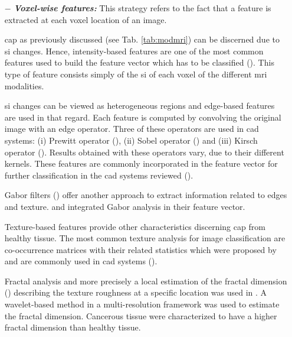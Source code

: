 \begin{enumerate}[leftmargin=*]

\item[$-$] \textbf{\textit{Voxel-wise features:}} This strategy refers to the fact that a feature is extracted at each voxel location of an image.

  \ac{cap} as previously discussed (see Tab. \ref{tab:modmri}) can be discerned due to \ac{si} changes. Hence, intensity-based features are one of the most common features used to build the feature vector which has to be classified (\cite{Ampeliotis2007,Ampeliotis2008,Artan2009,Artan2010,Chan2003,Langer2009,Litjens2011,Litjens2012,Litjens2014,Liu2009,Niaf2011,Niaf2012,Viswanath2008a,Viswanath2011}). This type of feature consists simply of the \ac{si} of each voxel of the different \ac{mri} modalities.

  \Ac{si} changes can be viewed as heterogeneous regions and edge-based features are used in that regard. Each feature is computed by convolving the original image with an edge operator. Three of these operators are used in \ac{cad} systems: (i) Prewitt operator (\cite{Prewitt1970}), (ii) Sobel operator (\cite{Sobel1970}) and (iii) Kirsch operator (\cite{Kirsch1971}). Results obtained with these operators vary, due to their different kernels. These features are commonly incorporated in the feature vector for further classification in the \ac{cad} systems reviewed (\cite{Niaf2011,Niaf2012,Tiwari2009a,Tiwari2010,Tiwari2013,Viswanath2008,Viswanath2011}).

  Gabor filters (\cite{Gabor1946,Daugman1985}) offer another approach to extract information related to edges and texture. \cite{Viswanath2008a,Viswanath2012} and \cite{Tiwari2012} integrated Gabor analysis in their feature vector.

  Texture-based features provide other characteristics discerning \ac{cap} from healthy tissue. The most common texture analysis for image classification are co-occurrence matrices with their related statistics which were proposed by \cite{Haralick1973} and are commonly used in \ac{cad} systems (\cite{Antic2013,Niaf2011,Niaf2012,Tiwari2009a,Tiwari2010,Tiwari2013,Viswanath2008,Viswanath2008a,Viswanath2011,Viswanath2012}).

  Fractal analysis and more precisely a local estimation of the fractal dimension (\cite{Benassi1998}) describing the texture roughness at a specific location was used in \cite{Lopes2011}. A wavelet-based method in a multi-resolution framework was used to estimate the fractal dimension. Cancerous tissue were characterized to have a higher fractal dimension than healthy tissue.


\end{enumerate}
